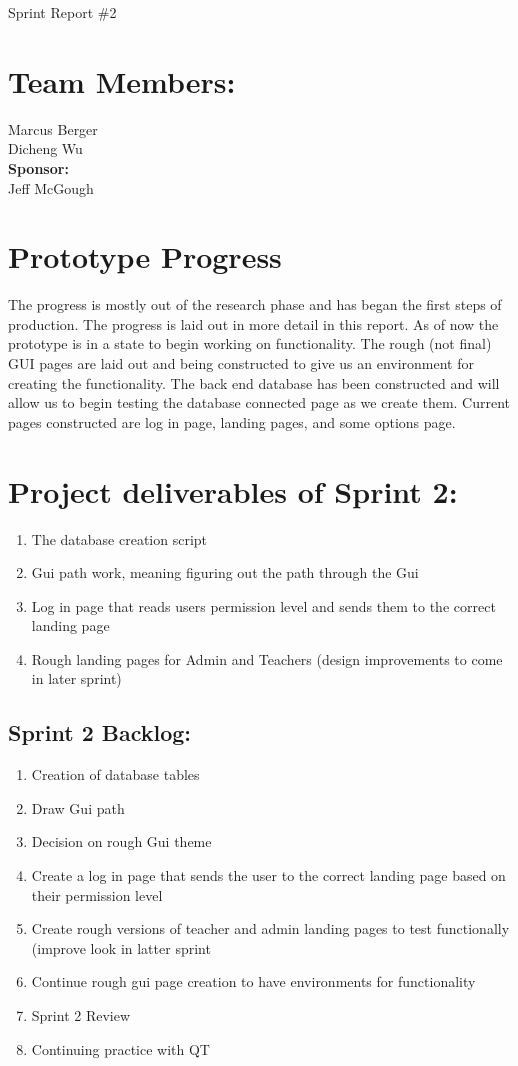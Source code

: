 \documentclass[11pt]{book}
\begin{document}
\fontsize{16}{16}\selectfont Sprint Report \#2


\section{Team Members:}
Marcus Berger
\\Dicheng Wu\\
\textbf{Sponsor:}
\\Jeff McGough
\\

\section{Prototype Progress}
The progress is mostly out of the research phase and has began the first steps of production. The progress is laid out in more detail in this report. As of now the prototype is in a state to begin working on functionality. The rough (not final) GUI pages are laid out and being constructed to give us an environment for creating the functionality. The back end database has been constructed and will allow us to begin testing the database connected page as we create them. Current pages constructed are log in page, landing pages, and some options page.

\section{Project deliverables of Sprint 2:}

\begin{enumerate}
\item The database creation script  
\item Gui path work, meaning figuring out the path through the Gui
\item Log in page that reads users permission level and sends them to the correct landing page
\item Rough landing pages for Admin and Teachers (design improvements to come in later sprint) 
\end{enumerate}


\subsection{Sprint 2 Backlog:}

\begin{enumerate}
\item Creation of database tables 
\item Draw Gui path
\item Decision on rough Gui theme
\item Create a log in page that sends the user to the correct landing page based on their permission level
\item Create rough versions of teacher and admin landing pages to test functionally (improve look in latter sprint 
\item Continue rough gui page creation to have environments for functionality 
\item Sprint 2 Review
\item Continuing practice with QT
\end{enumerate}
\end{document}
